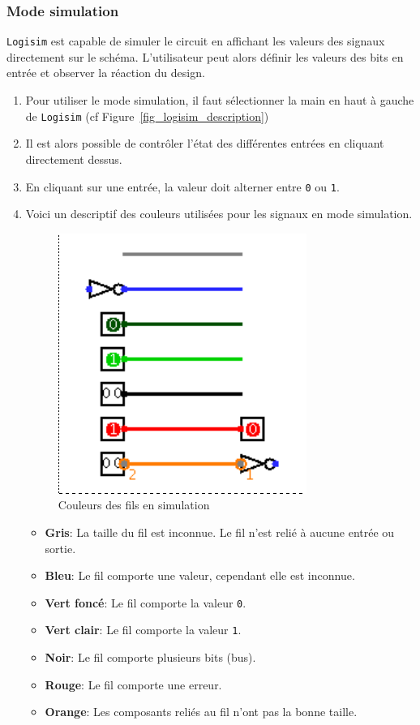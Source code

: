 \subsubsection{Mode simulation}
\texttt{Logisim} est capable de simuler le circuit en affichant les valeurs des signaux directement sur le schéma. L'utilisateur
peut alors définir les valeurs des bits en entrée et observer la réaction du design.
\begin{enumerate}
\item Pour utiliser le mode simulation, il faut sélectionner la main en haut à gauche de \texttt{Logisim} (cf
Figure~\ref{fig_logisim_description})

\item Il est alors possible de contrôler l'état des différentes entrées en cliquant directement dessus.

\item En cliquant sur une entrée, la valeur doit alterner entre \texttt{0} ou \texttt{1}.

\item Voici un descriptif des couleurs utilisées pour les signaux en mode simulation.
\begin{figure}[H]
\begin{center}
\includegraphics[scale=0.4]{pictures/logisim_couleurs.png}
\caption{\label{fig_logisim_couleur}Couleurs des fils en simulation}
\end{center}
\end{figure}

\begin{itemize}
\item \textbf{Gris}: La taille du fil est inconnue. Le fil n'est relié à aucune entrée ou sortie.
\item \textbf{Bleu}: Le fil comporte une valeur, cependant elle est inconnue.
\item \textbf{Vert foncé}: Le fil comporte la valeur \texttt{0}.
\item \textbf{Vert clair}: Le fil comporte la valeur \texttt{1}.
\item \textbf{Noir}: Le fil comporte plusieurs bits (bus).
\item \textbf{Rouge}: Le fil comporte une erreur.
\item \textbf{Orange}: Les composants reliés au fil n'ont pas la bonne taille.
\end{itemize}

\end{enumerate}

